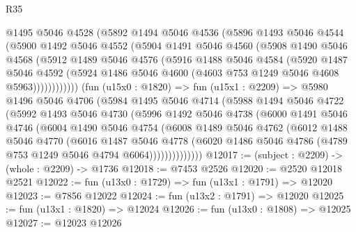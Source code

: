 \begin{lexlean}{R35}
\begin{coremodule}
            @1495
            @5046
            @4528
            (@5892
              @1494
              @5046
              @4536
              (@5896
                @1493
                @5046
                @4544
                (@5900
                  @1492
                  @5046
                  @4552
                  (@5904
                    @1491
                    @5046
                    @4560
                    (@5908
                      @1490
                      @5046
                      @4568
                      (@5912
                        @1489
                        @5046
                        @4576
                        (@5916
                          @1488
                          @5046
                          @4584
                          (@5920
                            @1487
                            @5046
                            @4592
                            (@5924 @1486 @5046 @4600 (@4603 @753 @1249 @5046 @4608 @5963))))))))))))
        (fun (u15x0 : @1820) =>
        fun (u15x1 : @2209) =>
        @5980
          @1496
          @5046
          @4706
          (@5984
            @1495
            @5046
            @4714
            (@5988
              @1494
              @5046
              @4722
              (@5992
                @1493
                @5046
                @4730
                (@5996
                  @1492
                  @5046
                  @4738
                  (@6000
                    @1491
                    @5046
                    @4746
                    (@6004
                      @1490
                      @5046
                      @4754
                      (@6008
                        @1489
                        @5046
                        @4762
                        (@6012
                          @1488
                          @5046
                          @4770
                          (@6016
                            @1487
                            @5046
                            @4778
                            (@6020
                              @1486
                              @5046
                              @4786
                              (@4789 @753 @1249 @5046 @4794 @6064))))))))))))))
@12017 := (subject : @2209) -> (whole : @2209) -> @1736
@12018 := @7453 @2526
@12020 := @2520 @12018 @2521
@12022 := fun (u13x0 : @1729) => fun (u13x1 : @1791) => @12020
@12023 := @7856 @12022
@12024 := fun (u13x2 : @1791) => @12020
@12025 := fun (u13x1 : @1820) => @12024
@12026 := fun (u13x0 : @1808) => @12025
@12027 := @12023 @12026

\end{coremodule}
\end{lexlean}
